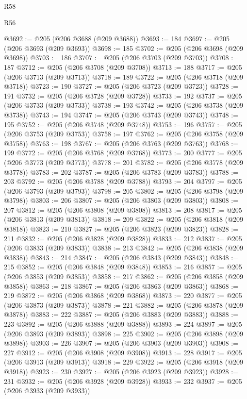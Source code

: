 \begin{lexlean}{R58}
\begin{lexlean}{R56}
\begin{coremodule}
{{{{{{{{{{{{{{{{{{{{{{{{{{{{{{{{{{{{{{{{{{{{{{{{{{{{{{{{{{{{{{{{{{{{{{{{{{{{{{{{{{{{{{{{{{{{{{{{{{{{{{{{{{{{{{{{{{{{{{{{{{{{{{{{{{{{{{{{{{{{{{{{{{{{{{{{{{{{{{{{{{{{{{{{{{{{{{{{{{{{{{{{{{{{{{{{{{{{{{{{{{{{{{{{{{{@3692 := @205 (@206 @3688 (@209 @3688))
@3693 := 184
@3697 := @205 (@206 @3693 (@209 @3693))
@3698 := 185
@3702 := @205 (@206 @3698 (@209 @3698))
@3703 := 186
@3707 := @205 (@206 @3703 (@209 @3703))
@3708 := 187
@3712 := @205 (@206 @3708 (@209 @3708))
@3713 := 188
@3717 := @205 (@206 @3713 (@209 @3713))
@3718 := 189
@3722 := @205 (@206 @3718 (@209 @3718))
@3723 := 190
@3727 := @205 (@206 @3723 (@209 @3723))
@3728 := 191
@3732 := @205 (@206 @3728 (@209 @3728))
@3733 := 192
@3737 := @205 (@206 @3733 (@209 @3733))
@3738 := 193
@3742 := @205 (@206 @3738 (@209 @3738))
@3743 := 194
@3747 := @205 (@206 @3743 (@209 @3743))
@3748 := 195
@3752 := @205 (@206 @3748 (@209 @3748))
@3753 := 196
@3757 := @205 (@206 @3753 (@209 @3753))
@3758 := 197
@3762 := @205 (@206 @3758 (@209 @3758))
@3763 := 198
@3767 := @205 (@206 @3763 (@209 @3763))
@3768 := 199
@3772 := @205 (@206 @3768 (@209 @3768))
@3773 := 200
@3777 := @205 (@206 @3773 (@209 @3773))
@3778 := 201
@3782 := @205 (@206 @3778 (@209 @3778))
@3783 := 202
@3787 := @205 (@206 @3783 (@209 @3783))
@3788 := 203
@3792 := @205 (@206 @3788 (@209 @3788))
@3793 := 204
@3797 := @205 (@206 @3793 (@209 @3793))
@3798 := 205
@3802 := @205 (@206 @3798 (@209 @3798))
@3803 := 206
@3807 := @205 (@206 @3803 (@209 @3803))
@3808 := 207
@3812 := @205 (@206 @3808 (@209 @3808))
@3813 := 208
@3817 := @205 (@206 @3813 (@209 @3813))
@3818 := 209
@3822 := @205 (@206 @3818 (@209 @3818))
@3823 := 210
@3827 := @205 (@206 @3823 (@209 @3823))
@3828 := 211
@3832 := @205 (@206 @3828 (@209 @3828))
@3833 := 212
@3837 := @205 (@206 @3833 (@209 @3833))
@3838 := 213
@3842 := @205 (@206 @3838 (@209 @3838))
@3843 := 214
@3847 := @205 (@206 @3843 (@209 @3843))
@3848 := 215
@3852 := @205 (@206 @3848 (@209 @3848))
@3853 := 216
@3857 := @205 (@206 @3853 (@209 @3853))
@3858 := 217
@3862 := @205 (@206 @3858 (@209 @3858))
@3863 := 218
@3867 := @205 (@206 @3863 (@209 @3863))
@3868 := 219
@3872 := @205 (@206 @3868 (@209 @3868))
@3873 := 220
@3877 := @205 (@206 @3873 (@209 @3873))
@3878 := 221
@3882 := @205 (@206 @3878 (@209 @3878))
@3883 := 222
@3887 := @205 (@206 @3883 (@209 @3883))
@3888 := 223
@3892 := @205 (@206 @3888 (@209 @3888))
@3893 := 224
@3897 := @205 (@206 @3893 (@209 @3893))
@3898 := 225
@3902 := @205 (@206 @3898 (@209 @3898))
@3903 := 226
@3907 := @205 (@206 @3903 (@209 @3903))
@3908 := 227
@3912 := @205 (@206 @3908 (@209 @3908))
@3913 := 228
@3917 := @205 (@206 @3913 (@209 @3913))
@3918 := 229
@3922 := @205 (@206 @3918 (@209 @3918))
@3923 := 230
@3927 := @205 (@206 @3923 (@209 @3923))
@3928 := 231
@3932 := @205 (@206 @3928 (@209 @3928))
@3933 := 232
@3937 := @205 (@206 @3933 (@209 @3933))
}}}}}}}}}}}}}}}}}}}}}}}}}}}}}}}}}}}}}}}}}}}}}}}}}}}}}}}}}}}}}}}}}}}}}}}}}}}}}}}}}}}}}}}}}}}}}}}}}}}}}}}}}}}}}}}}}}}}}}}}}}}}}}}}}}}}}}}}}}}}}}}}}}}}}}}}}}}}}}}}}}}}}}}}}}}}}}}}}}}}}}}}}}}}}}}}}}}}}}}}}}}}}}}}}}}
\end{coremodule}
\end{lexlean}
\end{lexlean}
